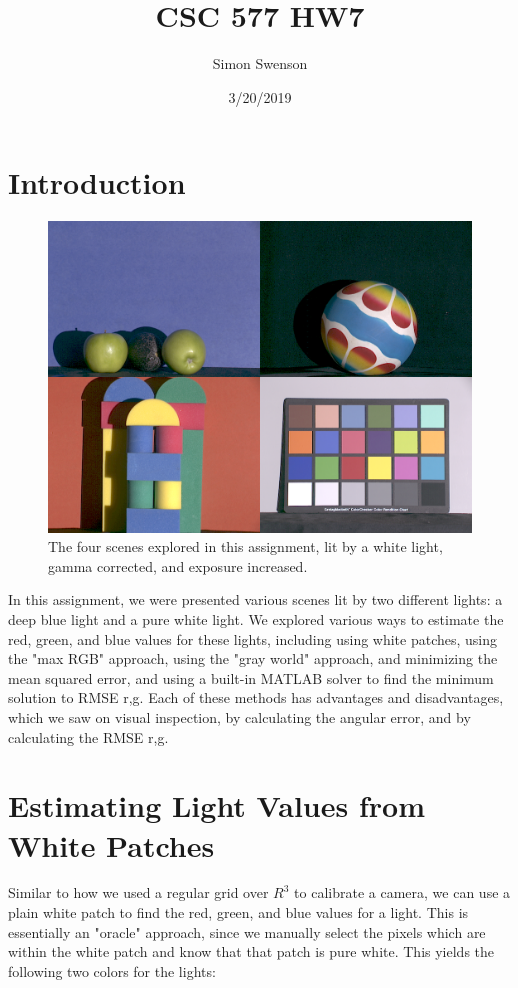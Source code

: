 \documentclass{article}
\title{CSC 577 HW7}
\date{3/20/2019}
\author{Simon Swenson}
\begin{document}
\maketitle
{}

\section{Introduction}

\begin{figure}[!ht]
	\centering
	\includegraphics[width=120mm]{figs/four-scenes_cc.png}
	\caption{The four scenes explored in this assignment, lit by a white light, 
        gamma corrected, and exposure increased.}
\end{figure}

In this assignment, we were presented various scenes lit by two different 
lights: a deep blue light and a pure white light. We explored various ways to 
estimate the red, green, and 
blue values for these lights, including using white patches, using the 
"max RGB" approach, using the "gray world" approach, and minimizing the mean 
squared error, and using a built-in MATLAB solver to find the minimum solution 
to RMSE r,g. Each of these methods has advantages and disadvantages, which we 
saw on visual inspection, by calculating the angular error, and by calculating 
the RMSE r,g.

\section{Estimating Light Values from White Patches}

Similar to how we used a regular grid over $R^3$ to calibrate a camera, we can 
use a plain white patch to find the red, green, and blue values for a light. 
This is essentially an "oracle" approach, since we manually select the pixels 
which are within the white patch and know that that patch is pure white. This 
yields the following two colors for the lights:
\end{document}
